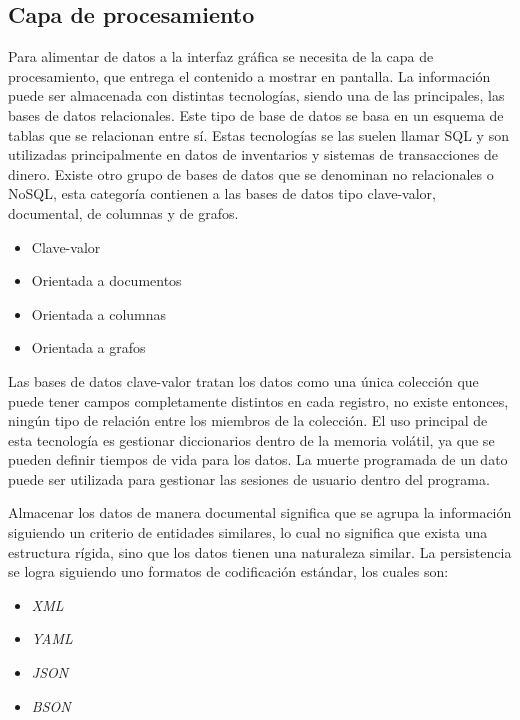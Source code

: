 \newpage

\subsection{Capa de procesamiento}
Para alimentar de datos a la interfaz gráfica se necesita de la capa de procesamiento, que entrega el contenido a mostrar en pantalla. La información puede ser almacenada con distintas tecnologías, siendo una de las principales, las bases de datos relacionales.
Este tipo de base de datos se basa en un esquema de tablas que se relacionan entre sí.
Estas tecnologías se las suelen llamar SQL y son utilizadas principalmente en datos de inventarios y sistemas de transacciones de dinero.
Existe otro grupo de bases de datos que se denominan no relacionales o NoSQL, esta categoría contienen a las bases de datos tipo clave-valor, documental, de columnas y de grafos.

\begin{itemize}
	\item Clave-valor
	\item Orientada a documentos
	\item Orientada a columnas
	\item Orientada a grafos
\end{itemize}

Las bases de datos clave-valor tratan los datos como una única colección que puede tener campos completamente distintos en cada registro, no existe entonces, ningún tipo de relación entre los miembros de la colección. El uso principal de esta tecnología es gestionar diccionarios dentro de la memoria volátil, ya que se pueden definir tiempos de vida para los datos. La muerte programada de un dato puede ser utilizada para gestionar las sesiones de usuario dentro del programa.

Almacenar los datos de manera documental significa que se agrupa la información siguiendo un criterio de entidades similares, lo cual no significa que exista una estructura rígida, sino que los datos tienen una naturaleza similar.
La persistencia se logra siguiendo uno formatos de codificación estándar, los cuales son:

\begin{itemize}
	\item \emph{XML}
	\item \emph{YAML}
	\item \emph{JSON}
	\item \emph{BSON}
\end{itemize}

